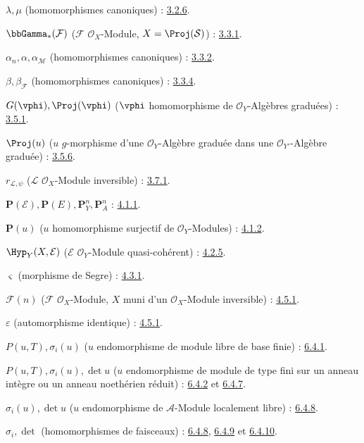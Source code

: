 $\lambda,\mu$ (homomorphismes canoniques) : \hyperref[II.3.2.6-fr]{3.2.6}.

$\bbGamma_*(\mathcal{F})$ ($\mathcal{F}$ $\mathcal{O}_X$-Module,
$X=\Proj(\mathcal{S})$) : \hyperref[II.3.3.1-fr]{3.3.1}.

$\alpha_n,\alpha,\alpha_{\mathcal{M}}$ (homomorphismes canoniques) : \hyperref[II.3.3.2-fr]{3.3.2}.

$\beta,\beta_{\mathcal{F}}$ (homomorphismes canoniques) : \hyperref[II.3.3.4-fr]{3.3.4}.

$G(\vphi),\Proj(\vphi)$
($\vphi$ homomorphisme de $\mathcal{O}_Y$-Algèbres graduées) : \hyperref[II.3.5.1-fr]{3.5.1}.

$\Proj(u)$ ($u$ $g$-morphisme d'une $\mathcal{O}_Y$-Algèbre graduée
dans une $\mathcal{O}_{Y'}$-Algèbre graduée) : \hyperref[II.3.5.6-fr]{3.5.6}.

$r_{\mathcal{L},\psi}$ ($\mathcal{L}$ $\mathcal{O}_X$-Module inversible) : \hyperref[II.3.7.1-fr]{3.7.1}.

$\mathbf{P}(\mathcal{E}),\mathbf{P}(E),\mathbf{P}_Y^n,\mathbf{P}_A^n$ : \hyperref[II.4.1.1-fr]{4.1.1}.

$\mathbf{P}(u)$ ($u$ homomorphisme surjectif de $\mathcal{O}_Y$-Modules) : \hyperref[II.4.1.2-fr]{4.1.2}.

$\Hyp_Y(X,\mathcal{E})$ ($\mathcal{E}$ $\mathcal{O}_Y$-Module quasi-cohérent) : \hyperref[II.4.2.5-fr]{4.2.5}.

$\varsigma$ (morphisme de Segre) : \hyperref[II.4.3.1-fr]{4.3.1}.

$\mathcal{F}(n)$ ($\mathcal{F}$ $\mathcal{O}_X$-Module, $X$ muni d'un
$\mathcal{O}_X$-Module inversible) : \hyperref[II.4.5.1-fr]{4.5.1}.

$\varepsilon$ (automorphisme identique) : \hyperref[II.4.5.1-fr]{4.5.1}.

$P(u,T),\sigma_i(u)$ ($u$ endomorphisme de module libre de base finie) : \hyperref[II.6.4.1-fr]{6.4.1}.

$P(u,T),\sigma_i(u),\det u$
($u$ endomorphisme de module de type fini sur un anneau intègre ou un
anneau noethérien réduit) : \hyperref[II.6.4.2-fr]{6.4.2} et \hyperref[II.6.4.7-fr]{6.4.7}.

$\sigma_i(u),\det u$ ($u$ endomorphisme de $\mathcal{A}$-Module localement libre) : \hyperref[II.6.4.8-fr]{6.4.8}.

$\sigma_i,\det$ (homomorphismes de faisceaux) : \hyperref[II.6.4.8-fr]{6.4.8}, \hyperref[II.6.4.9-fr]{6.4.9} et \hyperref[II.6.4.10-fr]{6.4.10}.

